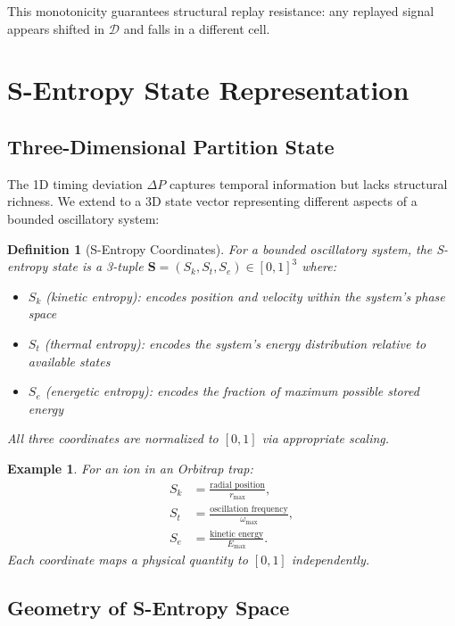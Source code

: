 \documentclass[twocolumn,11pt,a4paper]{article}
\newtheorem{definition}[theorem]{Definition}
\newtheorem{example}[theorem]{Example}
\newcommand{\DP}{\Delta P}
\newcommand{\Sk}{S_k}
\newcommand{\St}{S_t}
\newcommand{\Se}{S_e}
\newcommand{\Stuple}{\mathbf{S}}
\newcommand{\calD}{\mathcal{D}}
\begin{document}
This monotonicity guarantees structural replay resistance: any replayed signal appears shifted in $\calD$ and falls in a different cell.

\section{S-Entropy State Representation}
\label{sec:sentropy}

\subsection{Three-Dimensional Partition State}

The 1D timing deviation $\DP$ captures temporal information but lacks structural richness. We extend to a 3D state vector representing different aspects of a bounded oscillatory system:

\begin{definition}[S-Entropy Coordinates]
For a bounded oscillatory system, the \emph{S-entropy state} is a 3-tuple $\Stuple = (\Sk, \St, \Se) \in [0,1]^3$ where:
\begin{itemize}[nosep,leftmargin=1em]
  \item $\Sk$ (kinetic entropy): encodes position and velocity within the system's phase space
  \item $\St$ (thermal entropy): encodes the system's energy distribution relative to available states
  \item $\Se$ (energetic entropy): encodes the fraction of maximum possible stored energy
\end{itemize}
All three coordinates are normalized to $[0,1]$ via appropriate scaling.
\end{definition}

\begin{example}
For an ion in an Orbitrap trap:
\begin{align}
\Sk &= \frac{\text{radial position}}{r_{\max}}, \\
\St &= \frac{\text{oscillation frequency}}{\omega_{\max}}, \\
\Se &= \frac{\text{kinetic energy}}{E_{\max}}.
\end{align}
Each coordinate maps a physical quantity to $[0,1]$ independently.
\end{example}

\subsection{Geometry of S-Entropy Space}
\end{document}
